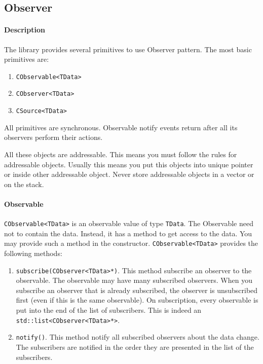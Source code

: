 \documentclass{article}
\begin{document}
\subsection{Observer}\label{section::Observer}

\paragraph{Description} The library provides several primitives to use Observer pattern. The most basic primitives are:
\begin{enumerate}
\item \verb"CObservable<TData>"
\item \verb"CObserver<TData>"
\item \verb"CSource<TData>"
\end{enumerate}

All primitives are synchronous. Observable notify events return after all its observers perform their actions.

All these objects are addressable. This means you must follow the rules for addressable objects. Usually this means you put this objects into unique pointer or inside other addressable object. Never store addressable objects in a vector or on the stack.

\paragraph{Observable}
\verb"CObservable<TData>" is an observable value of type \verb"TData". The Observable need not to contain the data. Instead, it has a method to get access to the data. You may provide such a method in the constructor. \verb"CObservable<TData>" provides the following methods:
\begin{enumerate}
\item \verb"subscribe(CObserver<TData>*)". This method subscribe an observer to the observable. The observable may have many subscribed observers. When you subscribe an observer that is already subscribed, the observer is unsubscribed first (even if this is the same observable). On subscription, every observable is put into the end of the list of subscribers. This is indeed an \verb"std::list<CObserver<TData>*>".

\item \verb"notify()". This method notify all subscribed observers about the data change. The subscribers are notified in the order they are presented in the list of the subscribers.
\end{enumerate}
\end{document}
